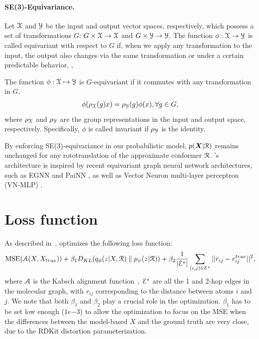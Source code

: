 \vspace{-1ex}
\paragraph{SE(3)-Equivariance.} Let ${\mathcal{X}}$ and ${\mathcal{Y}}$ be the input and output vector spaces, respectively, which possess a set of transformations $G$: $G\times{\mathcal{X}}\rightarrow{\mathcal{X}}$ and $G\times{\mathcal{Y}}\rightarrow{\mathcal{Y}}$. The function $\phi: {\mathcal{X}}\rightarrow{\mathcal{Y}}$ is called equivariant with respect to $G$ if, when we apply any transformation to the input, the output also changes via the same transformation or under a certain predictable behavior, \ie,
\begin{definition}
The function $\phi: {\mathcal{X}}\mapsto{\mathcal{Y}}$ is $G$-equivariant if it commutes with any transformation in $G$,
\begin{eqnarray}
\label{eq:equ}
\phi (\rho_{{\mathcal{X}}}(g)x) = \rho_{{\mathcal{Y}}}(g)\phi(x), \forall g\in G,
\end{eqnarray}
where $\rho_{{\mathcal{X}}}$ and $\rho_{{\mathcal{Y}}}$ are the group representations in the input and output space, respectively. Specifically, $\phi$ is called invariant if $\rho_{\mathcal{Y}}$ is the identity.
\end{definition}
By enforcing SE(3)-equivariance in our probabilistic model,  $p({\bm{X}} | {\mathcal{R}})$ remains unchanged for any rototranslation of the approximate conformer ${\mathcal{R}}$.
\modelns's architecture is inspired by recent equivariant graph neural network architectures, such as EGNN \citep{EGNN} and PaiNN \citep{painn}, as well as Vector Neuron multi-layer perceptron (VN-MLP) \citep{vn-mlp}.

\section{Loss function}
\label{section:appendix-loss-func}
\vspace{-1ex}
As described in~, \model optimizes the following loss function:
\begin{equation}
\begin{aligned}
    \text{MSE}({\mathcal{A}}(X,X_{true})) + \beta_1 D_{KL}(q_\phi(z | X, {\mathcal{R}})\parallel p_\psi(z|{\mathcal{R}})) + \beta_2 \frac{1}{|{\mathcal{E}}^*|}\sum_{(i,j) \in{\mathcal{E}}^*}||r_{ij} - r^{true}_{ij}||^2,
\label{eq:loss}
\end{aligned}
\end{equation}
where ${\mathcal{A}}$ is the Kabsch alignment function~\citep{Kabsch}, ${\mathcal{E}}^*$ are all the 1 and 2-hop edges in the molecular graph, with $r_{ij}$ corresponding to the distance between atoms $i$ and $j$. We note that both $\beta_1$ and $\beta_2$ play a crucial role in the optimization. $\beta_1$ has to be set low enough ($1e{-3}$) to allow the optimization to focus on the MSE when the differences between the model-based $X$ and the ground truth are very close, due to the RDKit distortion parameterization. 

